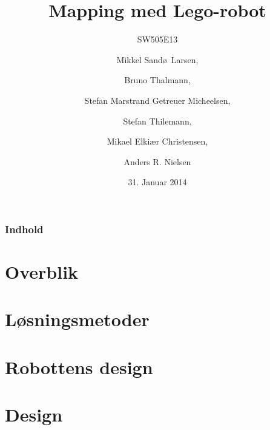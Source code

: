 \documentclass{beamer}
\title[Mapping med Lego-robot]{Mapping med Lego-robot}
\subtitle{SW505E13}
\author[SW505E13]{Mikkel Sand\o ~Larsen, \and Bruno Thalmann, \and Stefan Marstrand Getreuer Micheelsen, \and Stefan Thilemann, \and Mikael Elki\ae r Christensen, \and Anders R. Nielsen}
\institute[Aalborg University]
{
  Department of Computer Science\\
  Aalborg University}
\date[CFP 2003]{31. Januar 2014}
\begin{document}

\begin{frame}
  \titlepage
\end{frame}

\begin{frame}
    \frametitle{Indhold}
    \tableofcontents[sectionstyle=show/show,subsectionstyle=hide/hide/hide]
\end{frame}

\section{Overblik}



\section{Løsningsmetoder}

\section{Robottens design}





\section{Design}


\end{document}
